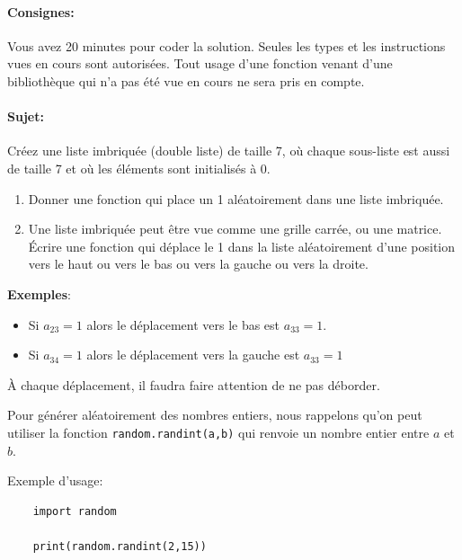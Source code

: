 \documentclass[a4paper,11pt]{article}
\begin{document}
\paragraph*{Consignes:} Vous avez 20 minutes pour coder la solution. Seules les types et les instructions vues en cours sont autorisées. Tout usage d'une fonction 
venant d'une bibliothèque qui n'a pas été vue en cours ne sera pris en compte. 



\paragraph*{Sujet:}



Créez une liste imbriquée (double liste)  de taille 7, où chaque sous-liste est aussi de taille 7 et où les éléments sont initialisés à 0. 
\begin{enumerate}
  \item[1.] Donner une fonction qui place un 1 aléatoirement dans une  liste imbriquée.   
  \item[2.] Une liste imbriquée peut être  vue comme une grille carrée, ou une matrice. 
\'Ecrire  une fonction qui déplace le 1 dans la liste aléatoirement d'une position vers le haut ou vers le bas ou vers la gauche ou vers la droite. %
\end{enumerate}

\textbf{Exemples}:
\noindent
\begin{itemize}
\item Si $a_{23}=1$  alors le déplacement vers le bas est  $a_{33}=1$.  \\
\item Si $a_{34}=1$ alors le déplacement vers la gauche est $a_{33}=1$ \\
\end{itemize} 

\`A chaque déplacement, il faudra faire attention de ne pas déborder. 


\vspace{0.2 cm}
Pour générer aléatoirement des nombres entiers, nous rappelons qu'on peut utiliser la fonction \texttt{random.randint(a,b)} qui renvoie un nombre entier entre $a$ et $b$. 

\vspace{0.2 cm}
Exemple d'usage:
\vspace{-0.2 cm}
\begin{verbatim}
	import random
	
	print(random.randint(2,15))
\end{verbatim}
\end{document}
